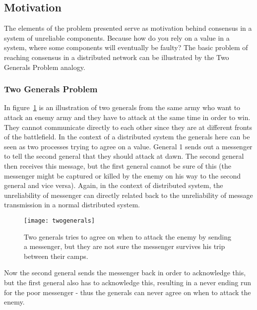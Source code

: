 

\subsection{Motivation} %
\label{sub:motivation}

The elements of the problem presented serve as motivation behind consensus in a system of unreliable components. Because how do you rely on a value in a system, where some components will eventually be faulty? The basic problem of reaching consensus in a distributed network can be illustrated by the Two Generals Problem analogy.

\subsubsection{Two Generals Problem} %
\label{ssub:two_generals_problem}

In figure~\ref{generals} is an illustration of two generals from the same army who want to attack an enemy army and they have to attack at the same time in order to win. They cannot communicate directly to each other since they are at different fronts of the battlefield. In the context of a distributed system the generals here can be seen as two processes trying to agree on a value.
General 1 sends out a messenger to tell the second general that they should attack at dawn. The second general then receives this message, but the first general cannot be sure of this (the messenger might be captured or killed by the enemy on his way to the second general and vice versa). Again, in the context of distributed system, the unreliability of messenger can directly related back to the unreliability of message transmission in a normal distributed system.

\begin{figure}[h]
	\centering
	\texttt{[image: twogenerals]}
	\caption{Two generals tries to agree on when to attack the enemy by sending a messenger, but they are not sure the messenger survives his trip between their camps.}
	\label{generals}
\end{figure}

Now the second general sends the messenger back in order to acknowledge this, but the first general also has to acknowledge this, resulting in a never ending run for the poor messenger - thus the generals can never agree on when to attack the enemy.

